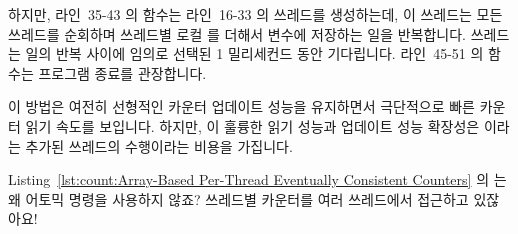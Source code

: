 하지만, 라인~35-43 의  함수는 라인~16-33 의 
쓰레드를 생성하는데, 이 쓰레드는 모든 쓰레드를 순회하며 쓰레드별 로컬
 를 더해서  변수에 저장하는 일을 반복합니다.
 쓰레드는 일의 반복 사이에 임의로 선택된 1 밀리세컨드 동안
기다립니다.
라인~45-51 의  함수는 프로그램 종료를 관장합니다.

이 방법은 여전히 선형적인 카운터 업데이트 성능을 유지하면서 극단적으로 빠른
카운터 읽기 속도를 보입니다.
하지만, 이 훌륭한 읽기 성능과 업데이트 성능 확장성은  이라는
추가된 쓰레드의 수행이라는 비용을 가집니다.

\QuickQuiz{}
	Listing~\ref{lst:count:Array-Based Per-Thread Eventually Consistent Counters}
	의  는 왜 어토믹 명령을 사용하지 않죠?
	쓰레드별 카운터를 여러 쓰레드에서 접근하고 있잖아요!
	\iffalse

